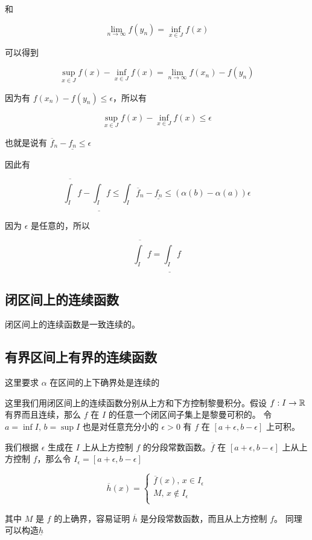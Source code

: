 和

\[
\lim_{n \to \infty}f(y_n) = \inf_{x \in J}f(x)
\]

可以得到

\[
\sup_{x \in J}f(x) - \inf_{x \in J}f(x) = \lim_{n \to \infty}f(x_n) - f(y_n)
\]

因为有 $f(x_n) - f(y_n) \le \epsilon$，所以有

\[
\sup_{x \in J}f(x) - \inf_{x \in J}f(x) \le \epsilon
\]

也就是说有 $\overline{f}_n - \underline{f_n} \le \epsilon $

因此有

\[
\overline{\int_I}f - \underline{\int_I}f \le \int_{I}\overline{f}_n - \underline{f_n} \le (\alpha(b) - \alpha(a))\epsilon
\]

因为 $\epsilon$ 是任意的，所以

\[
\overline{\int_I}f = \underline{\int_I}f
\]

\subsection{闭区间上的连续函数}

闭区间上的连续函数是一致连续的。

\subsection{有界区间上有界的连续函数}

这里要求 $\alpha$ 在区间的上下确界处是连续的

这里我们用闭区间上的连续函数分别从上方和下方控制黎曼积分。假设 $f: I \to \mathbb{R}$ 有界而且连续，那么 $f$ 在 $I$ 的任意一个闭区间子集上是黎曼可积的。
令 $a = \inf I,\, b = \sup I$ 也是对任意充分小的 $\epsilon > 0$ 有 $f$ 在 $[a+\epsilon, b-\epsilon]$ 上可积。

我们根据 $\epsilon$ 生成在 $I$ 上从上方控制 $f$ 的分段常数函数。$\overline{f}$ 在 $[a+\epsilon, b- \epsilon]$ 上从上方控制 $f$，那么令
$I_{\epsilon} = [a+\epsilon, b- \epsilon]$

\[
\overline{h}(x) = \begin{cases}
    \overline{f}(x),\, x \in I_{\epsilon} \\
    M,\, x \notin I_{\epsilon} \\
\end{cases}
\]

其中 $M$ 是 $f$ 的上确界，容易证明 $\overline{h}$ 是分段常数函数，而且从上方控制 $f$。
同理可以构造$\underline{h}$


